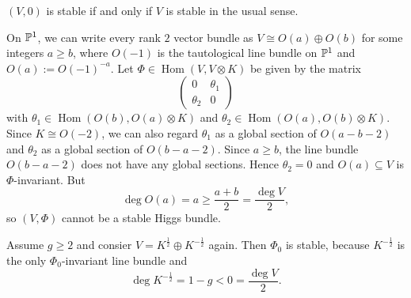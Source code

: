 \documentclass[A4paper, 12pt, british, reqno]{amsart}
\DeclareMathOperator{\Hom}{Hom}
\newcommand{\ot}{\otimes}
\newcommand{\op}{\oplus}
\begin{document}
\begin{rem}
    $(V,0)$ is stable if and only if $V$ is stable in the usual sense.
\end{rem}

\begin{rem}

\end{rem}

\begin{exa}
    On $\P^{1}$, we can write every rank $2$ vector bundle as $V\cong O(a)\op O(b)$ for some integers $a\geqslant b$, where $O(-1)$ is the tautological line bundle on $\P^{1}$ and $O(a):=O(-1)^{-a}$.
    Let $\Phi\in \Hom(V,V\ot K)$ be given by the matrix
    \[
	\begin{pmatrix}
	    0 & \theta_{1} \\
	    \theta_{2} & 0
	\end{pmatrix}
    \]
    with $\theta_{1}\in \Hom(O(b),O(a)\ot K)$ and $\theta_{2}\in \Hom(O(a),O(b)\ot K)$.
    Since $K\cong O(-2)$, we can also regard $\theta_{1}$ as a global section of $O(a-b-2)$ and $\theta_{2}$ as a global section of $O(b-a-2)$.
    Since $a\geqslant b$, the line bundle $O(b-a-2)$ does not have any global sections.
    Hence $\theta_{2}=0$ and $O(a)\subseteq V$ is $\Phi$-invariant.
    But
    \[ \deg{O(a)}=a\geqslant \frac{a+b}{2}=\frac{\deg{V}}{2}, \]
    so $(V,\Phi)$ cannot be a stable Higgs bundle.
\end{exa}

\begin{exa}
    Assume $g\geqslant 2$ and consier $V=K^{\frac{1}{2}}\op K^{-\frac{1}{2}}$ again.
    Then $\Phi_{0}$ is stable, because $K^{-\frac{1}{2}}$ is the only $\Phi_{0}$-invariant line bundle and
    \[ \deg{K^{-\frac{1}{2}}}=1-g<0=\frac{\deg{V}}{2}. \]
\end{exa}
\end{document}
